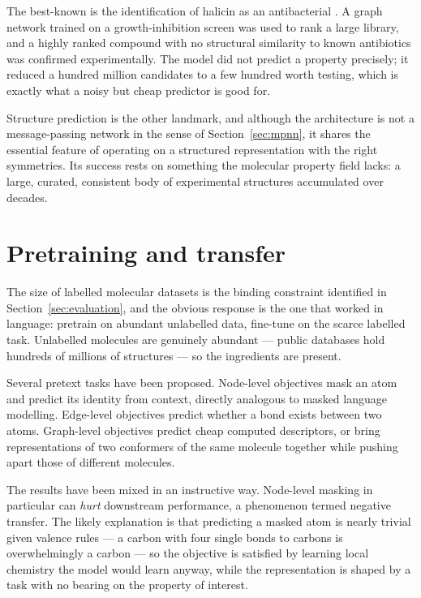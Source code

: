 \documentclass[11pt,a4paper]{article}
\begin{document}
The best-known is the identification of halicin as an antibacterial
\cite{stokes2020}. A graph network trained on a growth-inhibition screen was
used to rank a large library, and a highly ranked compound with no structural
similarity to known antibiotics was confirmed experimentally. The model did
not predict a property precisely; it reduced a hundred million candidates to a
few hundred worth testing, which is exactly what a noisy but cheap predictor
is good for.

Structure prediction \cite{jumper2021} is the other landmark, and although the
architecture is not a message-passing network in the sense of
Section~\ref{sec:mpnn}, it shares the essential feature of operating on a
structured representation with the right symmetries. Its success rests on
something the molecular property field lacks: a large, curated, consistent
body of experimental structures accumulated over decades.

\section{Pretraining and transfer}
\label{sec:pretraining}

The size of labelled molecular datasets is the binding constraint identified
in Section~\ref{sec:evaluation}, and the obvious response is the one that
worked in language: pretrain on abundant unlabelled data, fine-tune on the
scarce labelled task. Unlabelled molecules are genuinely abundant --- public
databases hold hundreds of millions of structures --- so the ingredients are
present.

Several pretext tasks have been proposed. Node-level objectives mask an atom
and predict its identity from context, directly analogous to masked language
modelling. Edge-level objectives predict whether a bond exists between two
atoms. Graph-level objectives predict cheap computed descriptors, or bring
representations of two conformers of the same molecule together while pushing
apart those of different molecules.

The results have been mixed in an instructive way. Node-level masking in
particular can \emph{hurt} downstream performance, a phenomenon termed
negative transfer. The likely explanation is that predicting a masked atom is
nearly trivial given valence rules --- a carbon with four single bonds to
carbons is overwhelmingly a carbon --- so the objective is satisfied by
learning local chemistry the model would learn anyway, while the
representation is shaped by a task with no bearing on the property of
interest.
\end{document}
